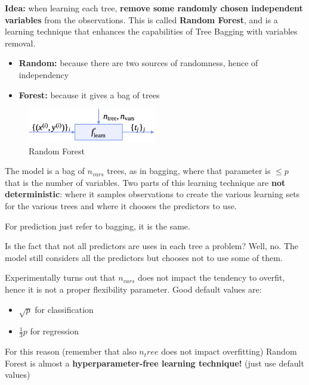\textbf{Idea:} when learning each tree, \textbf{remove some randomly chosen independent variables} from the observations. This is called \textbf{Random Forest}, and is a learning technique that enhances the capabilities of Tree Bagging with variables removal.
\begin{itemize}
    \item \textbf{Random:} because there are two sources of randomness, hence of independency
    \item \textbf{Forest:} because it gives a bag of trees 
\end{itemize}

\begin{center}
    \begin{figure}[H]
        \centering 
        \includegraphics[width=0.5\textwidth]{assets/fig22.png}
        \caption{Random Forest}
    \end{figure}
\end{center}

The model is a bag of $n_{vars}$ trees, as in bagging, where that parameter is $\leq p$ that is the number of variables. Two parts of this learning technique are \textbf{not deterministic}: where it samples observations to create the various learning sets for the various trees and where it chooses the predictors to use.

For prediction just refer to bagging, it is the same.

Is the fact that not all predictors are uses in each tree a problem? Well, no. The model still considers all the predictors but chooses not to use some of them.


Experimentally turns out that $n_{vars}$ does not impact the tendency to overfit, hence it is not a proper flexibility parameter. 
Good default values are:
\begin{itemize}
    \item $\sqrt{p}$ for classification 
    \item $\frac{1}{3}p$ for regression 
\end{itemize}

For this reason (remember that also $n_tree$ does not impact overfitting) Random Forest is almost a \textbf{hyperparameter-free learning technique!} (\to just use default values)

